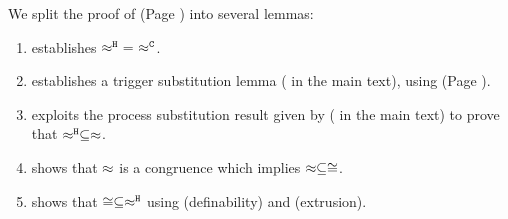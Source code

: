 \noi We split the proof of  (Page \pageref{the:coincidence}) into 
several lemmas:
\begin{enumerate}[$-$]
\item	{} establishes $\hwb\ =\ \fwb$.
\item    {} establishes a trigger substitution lemma ( in the main text), using 
 (Page \pageref{lem:trigger_application}).
\item	{} exploits the process substitution result
		given by  ( in the main text) to prove that $\approx^\mathtt{H} \subseteq \approx$.
\item	{} shows that $\approx$ is a congruence
		which implies $\approx \subseteq \cong$.
\item	{} shows  that $\cong \subseteq \approx^\mathtt{H}$ using 
 (definability) and  (extrusion).
\end{enumerate}

\newcommand{\ntrigger}[2]{#1 \leftharpoonup #2}
\newcommand{\newtrigger}[2]{\binp{#1}{x} \newsp{s}{\appl{x}{s} \Par \bout{\dual{s}}{#2} \inact} }

